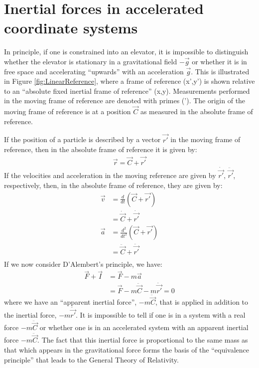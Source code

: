 \section{Inertial forces in accelerated coordinate systems}
In principle, if one is constrained into an elevator, it is impossible to distinguish whether the elevator is stationary in a gravitational field $-\vec{g}$ or whether it is in free space and accelerating ``upwards'' with an acceleration $\vec{g}$. This is illustrated in Figure \ref{fig:LinearReference}, where a frame of reference (x',y') is shown relative to an ``absolute fixed inertial frame of reference'' (x,y). Measurements performed in the moving frame of reference are denoted with primes ('). The origin of the moving frame of reference is at a position $\vec{C}$ as measured in the absolute frame of reference.


If the position of a particle is described by a vector $\vec{r'}$ in the moving frame of reference, then in the absolute frame of reference it is given by:
\begin{align}
\vec{r}=\vec{C}+\vec{r'}
\end{align}
If the velocities and acceleration in the moving reference are given by $\dot{\vec{r'}}$, $\ddot{\vec{r'}}$, respectively, then, in the absolute frame of reference, they are given by:
\begin{align}
\vec{v}&=\frac{d}{dt}(\vec{C}+\vec{r'})\nonumber\\
&=\dot{\vec{C}}+\dot{\vec{r'}}\nonumber\\
\vec{a}&=\frac{d^2}{dt^2}(\vec{C}+\vec{r'})\nonumber\\
&=\ddot{\vec{C}}+\ddot{\vec{r'}}\nonumber\\
\end{align}
If we now consider D'Alembert's principle, we have:
\begin{align}
\vec{F}+\vec{I}&=\vec{F}-m\vec{a} \nonumber\\
&=\vec{F}-m\ddot{\vec{C}}-m\ddot{\vec{r'}}=0
\end{align}
where we have an ``apparent inertial force'', $-m\ddot{\vec{C}}$, that is applied in addition to the inertial force, $-m\ddot{\vec{r'}}$. It is impossible to tell if one is in a system with a real force $-m\ddot{\vec{C}}$ or whether one is in an accelerated system with an apparent inertial force $-m\ddot{\vec{C}}$. The fact that this inertial force is proportional to the same mass as that which appears in the gravitational force forms the basis of the ``equivalence principle'' that leads to the General Theory of Relativity.

